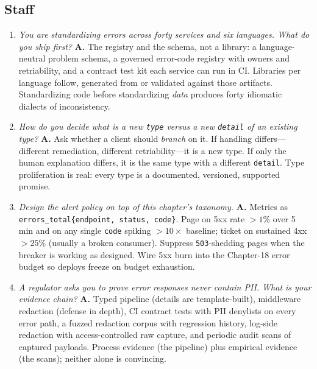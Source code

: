 \subsection*{Staff}

\begin{enumerate}[label=\textbf{Q\arabic*.}, leftmargin=3.2em, start=27]
  \item \emph{You are standardizing errors across forty services and six
        languages. What do you ship first?} \textbf{A.} The registry and the
        schema, not a library: a language-neutral problem schema, a governed
        error-code registry with owners and retriability, and a contract
        test kit each service can run in CI. Libraries per language follow,
        generated from or validated against those artifacts. Standardizing
        code before standardizing \emph{data} produces forty idiomatic
        dialects of inconsistency.
  \item \emph{How do you decide what is a new \texttt{type} versus a new
        \texttt{detail} of an existing type?} \textbf{A.} Ask whether a
        client should \emph{branch} on it. If handling differs---different
        remediation, different retriability---it is a new type. If only the
        human explanation differs, it is the same type with a different
        \texttt{detail}. Type proliferation is real: every type is a
        documented, versioned, supported promise.
  \item \emph{Design the alert policy on top of this chapter's taxonomy.}
        \textbf{A.} Metrics as \texttt{errors\_total\{endpoint, status,
        code\}}. Page on 5xx rate $>1\%$ over 5 min and on any single
        \texttt{code} spiking $>10\times$ baseline; ticket on sustained 4xx
        $>25\%$ (usually a broken consumer). Suppress \texttt{503}-shedding
        pages when the breaker is working as designed. Wire 5xx burn into
        the Chapter-18 error budget so deploys freeze on budget exhaustion.
  \item \emph{A regulator asks you to prove error responses never contain
        PII. What is your evidence chain?} \textbf{A.} Typed pipeline
        (details are template-built), middleware redaction (defense in
        depth), CI contract tests with PII denylists on every error path,
        a fuzzed redaction corpus with regression history, log-side
        redaction with access-controlled raw capture, and periodic audit
        scans of captured payloads. Process evidence (the pipeline) plus
        empirical evidence (the scans); neither alone is convincing.

\end{enumerate}
